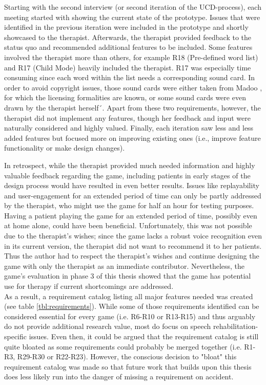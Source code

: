 \documentclass[draft,final]{vutinfth} %
\begin{document}
Starting with the second interview (or second iteration of the UCD-process), each meeting started with showing the current state of the prototype. Issues that were identified in the previous iteration were included in the prototype and shortly showcased to the therapist. Afterwards, the therapist provided feedback to the status quo and recommended additional features to be included. Some features involved the therapist more than others, for example R18 (Pre-defined word list) and R17 (Child Mode) heavily included the therapist. R17 was especially time consuming since each word within the list needs a corresponding sound card. In order to avoid copyright issues, those sound cards were either taken from Madoo \cite{Madoo}, for which the licensing formalities are known, or some sound cards were even drawn by the therapist herself´. Apart from these two requirements, however, the therapist did not implement any features, though her feedback and input were naturally considered and highly valued. Finally, each iteration saw less and less added features but focused more on improving existing ones (i.e., improve feature functionality or make design changes).

In retrospect, while the therapist provided much needed information and highly valuable feedback regarding the game, including patients in early stages of the design process would have resulted in even better results. Issues like replayability and user-engagement for an extended period of time can only be partly addressed by the therapist, who might use the game for half an hour for testing purposes. Having a patient playing the game for an extended period of time, possibly even at home alone, could have been beneficial. Unfortunately, this was not possible due to the therapist's wishes; since the game lacks a robust voice recognition even in its current version, the therapist did not want to recommend it to her patients. Thus the author had to respect the therapist's wishes and continue designing the game with only the therapist as an immediate contributor. Nevertheless, the game's evaluation in phase 3 of this thesis showed that the game has potential use for therapy if current shortcomings are addressed. \\

As a result, a requirement catalog listing all major features needed was created (see table \ref{tbl:requirements}). While some of those requirements identified can be considered essential for every game (i.e. R6-R10 or R13-R15) and thus arguably do not provide additional research value, most do focus on speech rehabilitation-specific issues. Even then, it could be argued that the requirement catalog is still quite bloated as some requirements could probably be merged together (i.e. R1-R3, R29-R30 or R22-R23). However, the conscious decision to "bloat" this requirement catalog was made so that future work that builds upon this thesis does less likely run into the danger of missing a requirement on accident.
\end{document}
